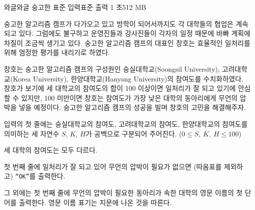 \begin{problem}{와글와글 숭고한}
    {표준 입력}{표준 출력}
    {1 초}{512 MB}{}
    
    숭고한 알고리즘 캠프가 다가오고 있고 방학이 되어서까지도 각 대학들의 협업은 계속되고 있다. 그럼에도 불구하고 운영진들과 강사진들이 각자의 일정 때문에 바빠 계획에 차질이 조금씩 생기고 있다. 숭고한 알고리즘 캠프의 대표인 창호는 효율적인 일처리를 위해 엄정한 평가를 내리기로 하였다.
    
    창호는 숭고한 알고리즘 캠프의 구성원인 숭실대학교(Soongsil University), 고려대학교(Korea University), 한양대학교(Hanyang University)의 참여도를 수치화하였다. 창호가 보기에 세 대학교의 참여도의 합이 100 이상이면 일처리가 잘 되고 있기에 안심할 수 있지만, 100 미만이면 창호는 참여도가 가장 낮은 대학의 동아리에게 무언의 압박을 넣을 예정이다. 숭고한 알고리즘 캠프의 성공을 빌며 창호의 고민을 해결해주자.
    
    
    \InputFile
    입력의 첫 줄에는 숭실대학교의 참여도, 고려대학교의 참여도, 한양대학교의 참여도를 의미하는 세 자연수 $S$, $K$, $H$가 공백으로 구분되어 주어진다. ($0 \leq S,\ K,\ H \leq 100$)
    
    세 대학의 참여도는 모두 다르다.
    
    \OutputFile
    
    첫 번째 줄에 일처리가 잘 되고 있어 무언의 압박이 필요가 없으면 (따옴표를 제외하고) \verb|“OK”|를 출력한다.
    
    그 외에는 첫 번째 줄에 무언의 압박이 필요한 동아리가 속한 대학의 영문 이름의 첫 단어를 출력한다. 영문 이름 표기는 지문에 나온 것을 따른다.
    
    \Examples
    
    \begin{example}
    \end{example}
    
\end{problem}


